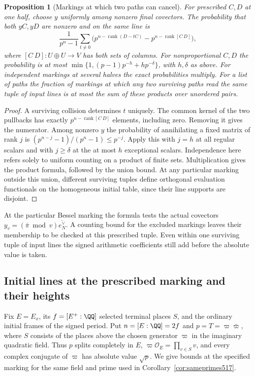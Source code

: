 \documentclass[a4paper,11pt]{article}
\newtheorem{proposition}{Proposition}[section]
\theoremstyle{definition}
\theoremstyle{remark}
\numberwithin{equation}{section}
\begin{document}
\begin{proposition}[Markings at which two paths can cancel]
\leavevmode\label{prop:markedpencil521}
For prescribed \(C,D\) at one half, choose \(y\) uniformly among
nonzero final covectors. The probability that both \(yC,yD\) are
nonzero and on the same line is
\[
 \frac{1}{p^n-1}\sum_{t\ne0}
       \bigl(p^{n-\operatorname{rank}(D-tC)}
                  -p^{n-\operatorname{rank}[C\ D]}\bigr),
\]
where \([C\ D]:U\oplus U\to V\) has both sets of columns.
For nonproportional \(C,D\) the probability is at most
\(\min\{1,(p-1)p^{-h}+h p^{-\delta}\}\), with \(h,\delta\) as
above. For independent markings at several halves the exact
probabilities multiply. For a list of paths the fraction of markings
at which any two surviving paths read the same tuple of input lines
is at most the sum of these products over unordered pairs.
\end{proposition}
\begin{proof}
A surviving collision determines \(t\) uniquely. The common kernel
of the two pullbacks has exactly \(p^{n-\operatorname{rank}[C\ D]}\)
elements, including zero. Removing it gives the numerator. Among
nonzero \(y\) the probability of annihilating a fixed matrix of rank
\(j\) is \((p^{n-j}-1)/(p^n-1)\le p^{-j}\). Apply this with
\(j=h\) at all regular scalars and with \(j\ge\delta\) at the at most
\(h\) exceptional scalars. Independence here refers solely to uniform
counting on a product of finite sets. Multiplication gives the
product formula, followed by the union bound. At any particular
marking outside this union, different surviving tuples define
orthogonal evaluation functionals on the homogeneous initial table,
since their line supports are disjoint.
\end{proof}

At the particular Bessel marking the formula tests the actual
covectors \(y_v=(\bar\pi\bmod v)\overline{e_N^\vee}\). A counting
bound for the excluded markings leaves their membership to be
checked at this prescribed tuple. Even within one surviving tuple
of input lines the signed arithmetic coefficients still add before
the absolute value is taken.


\subsection{Initial lines at the prescribed marking and their heights}
\label{sec:markedlines522}

Fix \(E=E_x\), its \(f=[E^+:\QQ]\) selected terminal places
\(S\), and the ordinary initial frames of the signed period. Put
\(n=[E:\QQ]=2f\) and \(p=T=\varpi\bar\varpi\), where \(S\) consists
of the places above the chosen generator \(\varpi\) in the imaginary
quadratic field. Thus \(p\) splits completely in \(E\),
\(\varpi\mathcal O_E=\prod_{v\in S}v\), and every complex conjugate
of \(\varpi\) has absolute value \(\sqrt p\). We give bounds at the
specified marking for the same field and prime used in
Corollary~\ref{cor:sameprimes517}.
\end{document}
